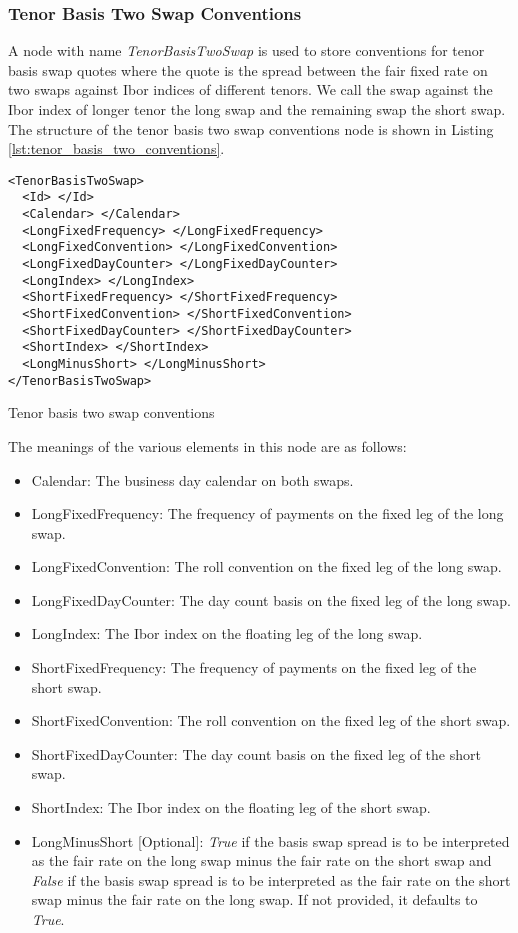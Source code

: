 \subsubsection{Tenor Basis Two Swap Conventions}
A node with name \emph{TenorBasisTwoSwap} is used to store conventions for tenor basis swap quotes where the quote is
the spread between the fair fixed rate on two swaps against Ibor indices of different tenors. We call the swap against
the Ibor index of longer tenor the long swap and the remaining swap the short swap. The structure of the tenor basis two
swap conventions node is shown in Listing \ref{lst:tenor_basis_two_conventions}.

\begin{listing}[H]
\begin{verbatim}
<TenorBasisTwoSwap>
  <Id> </Id>
  <Calendar> </Calendar>
  <LongFixedFrequency> </LongFixedFrequency>
  <LongFixedConvention> </LongFixedConvention>
  <LongFixedDayCounter> </LongFixedDayCounter>
  <LongIndex> </LongIndex>
  <ShortFixedFrequency> </ShortFixedFrequency>
  <ShortFixedConvention> </ShortFixedConvention>
  <ShortFixedDayCounter> </ShortFixedDayCounter>
  <ShortIndex> </ShortIndex>
  <LongMinusShort> </LongMinusShort>
</TenorBasisTwoSwap>
\end{verbatim}
\caption{Tenor basis two swap conventions}
\label{lst:tenor_basis_two_conventions}
\end{listing}

The meanings of the various elements in this node are as follows:
\begin{itemize}
\item Calendar: The business day calendar on both swaps.
\item LongFixedFrequency: The frequency of payments on the fixed leg of the long swap.
\item LongFixedConvention: The roll convention on the fixed leg of the long swap.
\item LongFixedDayCounter: The day count basis on the fixed leg of the long swap.
\item LongIndex: The Ibor index on the floating leg of the long swap.
\item ShortFixedFrequency: The frequency of payments on the fixed leg of the short swap.
\item ShortFixedConvention: The roll convention on the fixed leg of the short swap.
\item ShortFixedDayCounter: The day count basis on the fixed leg of the short swap.
\item ShortIndex: The Ibor index on the floating leg of the short swap.
\item LongMinusShort [Optional]: \emph{True} if the basis swap spread is to be interpreted as the fair rate on the long
swap minus the fair rate on the short swap and \emph{False} if the basis swap spread is to be interpreted as the fair
rate on the short swap minus the fair rate on the long swap. If not provided, it defaults to \emph{True}.
\end{itemize}

